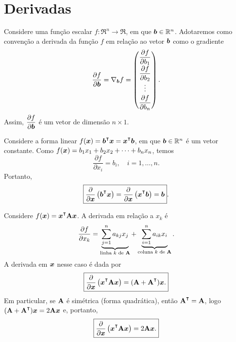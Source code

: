 \section{Derivadas}

\begin{definition}
	Considere uma função escalar $f : \Re^n \longrightarrow \Re$, em que $\bm{b}\in\mathbb{R}^n$. Adotaremos como convenção a derivada da função $f$ em relação ao vetor $\bm{b}$ como o gradiente
	\begin{equation}
		\frac{\partial f}{\partial \bm{b}} = \nabla_{\bm{b}} f =
		\begin{pmatrix}
			\dfrac{\partial f}{\partial b_1} \\[1.5ex]
			\dfrac{\partial f}{\partial b_2} \\[0.5ex]
			\vdots \\[0.5ex]
			\dfrac{\partial f}{\partial b_n}
		\end{pmatrix}.
	\end{equation}
	Assim, $\dfrac{\partial f}{\partial \bm{b}}$ é um vetor de dimensão $n\times 1$.
\end{definition}

\begin{theorem}
	Considere a forma linear $f(\v{x}) = \v{b}\T\v{x} = \v{x}\T\v{b}$, em que $\bm{b}\in\mathbb{R}^n$ é um vetor constante. Como $f(\bm{x}) = b_1x_1 + b_2x_2 + \cdots + b_nx_n$, temos
	\begin{equation}
		\frac{\partial f}{\partial x_i} = b_i, \quad i=1,\ldots,n.
	\end{equation}
	Portanto,
	\begin{equation}
		\boxed{\dfrac{\partial}{\partial \v{x}}\left(\v{b}\T\v{x}\right) = \dfrac{\partial}{\partial \v{x}}\left(\v{x}\T\v{b}\right) = \v{b}}.
	\end{equation}
\end{theorem}

\begin{theorem}
	Considere $f(\v{x}) = \v{x}\T\m{A}\v{x}$. A derivada em relação a $x_k$ é
	\begin{equation}
		\frac{\partial f}{\partial x_k} = \underbrace{\sum_{j=1}^n a_{kj}x_j}_{\text{linha } k \text{ de } \mathbf{A}} + \underbrace{\sum_{i=1}^n a_{ik}x_i}_{\text{coluna } k \text{ de } \mathbf{A}}.
	\end{equation}
	A derivada em $\bm{x}$ nesse caso é dada por
	\begin{equation}
		\boxed{\frac{\partial}{\partial \v{x}}\left(\v{x}\T\m{A}\v{x}\right) = (\m{A}+\m{A}\T)\v{x}.}
	\end{equation}
	Em particular, se $\mathbf{A}$ é simétrica (forma quadrática), então $\m{A}\T=\m{A}$, logo $(\m{A}+\m{A}\T)\v{x} = 2\m{A}\v{x}$ e, portanto,
	\begin{equation}
		\boxed{\frac{\partial}{\partial \v{x}}\left(\v{x}\T\m{A}\v{x}\right) = 2\m{A}\v{x}.}
	\end{equation}
\end{theorem}

